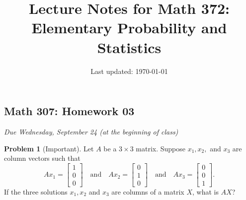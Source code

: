 \documentclass[10pt]{article}
\title{Lecture Notes for Math 372: \\Elementary Probability and Statistics}
\date{Last updated: \today}
\theoremstyle{definition}
\newtheorem{problem}[theorem]{Problem}
\newcommand{\1}[1]{\textbf{1}_{\left[#1\right]}} %
\begin{document}
\begin{center}
  \section*{Math 307: Homework 03}
  \textit{Due Wednesday, September 24 (at the beginning of class)}
\end{center}


\begin{problem}[Important] %
  Let $A$ be a $3\times 3$ matrix. Suppose $x_{1},x_{2},$ and $x_{3}$ are
  column vectors such that
  \begin{equation*}
    Ax_{1} =
    \begin{bmatrix}
      1\\0\\0
    \end{bmatrix}
    \quad \text{and} \quad
    Ax_{2} =
    \begin{bmatrix}
      0\\1\\0
    \end{bmatrix}
    \quad \text{and} \quad
    Ax_{3} =
    \begin{bmatrix}
      0\\0\\1
    \end{bmatrix}.
  \end{equation*}
  If the three solutions $x_{1},x_{2}$ and $x_{3}$ are columns of a matrix
  $X$, what is $AX$?
\end{problem}
\end{document}
